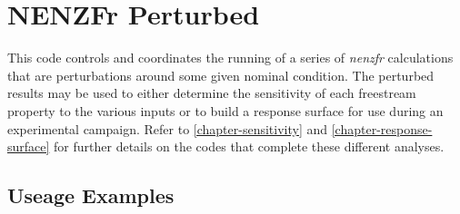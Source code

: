 
\newpage
\section{NENZFr Perturbed}
\label{chapter-perturbed}
This code controls and coordinates the running of a series of \textit{nenzfr} calculations that are perturbations around some given nominal condition. The perturbed results may be used to either determine the sensitivity of each freestream property to the various inputs or to build a response surface for use during an experimental campaign. Refer to \cref{chapter-sensitivity} and \cref{chapter-response-surface} for further details on the codes that complete these different analyses.

\subsection{Useage Examples}
